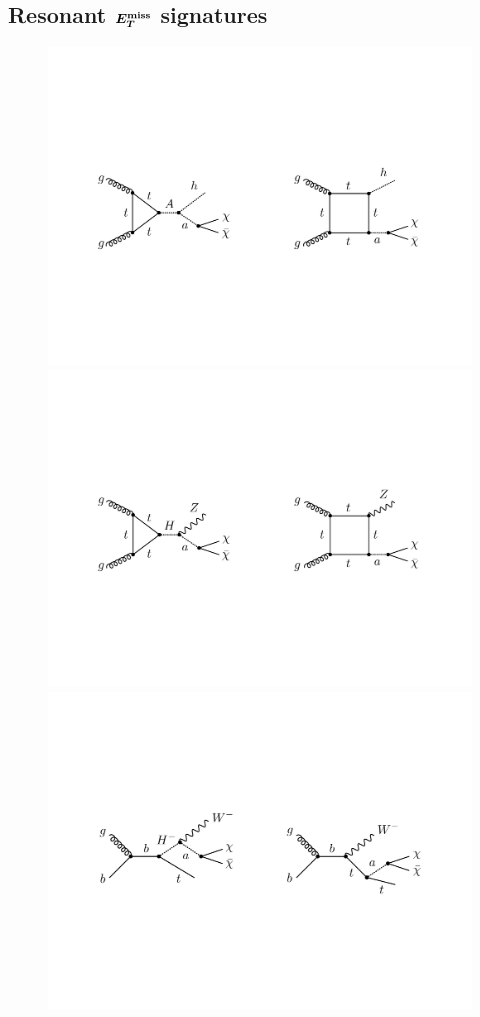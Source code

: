 \documentclass[a4paper, 11pt,notoc]{article}
\def\bm#1{\mbox{\boldmath$#1$\unboldmath}}
\begin{document}
\subsection[Resonant $E_T^{\rm miss}$ signatures]{Resonant $\bm{E_T^{\rm miss}}$ signatures}
\label{sec:resonant}

\begin{figure}[t!]
\centering
\includegraphics[width=.8\textwidth]{hmet.pdf}

\vspace{4mm}

\includegraphics[width=.8\textwidth]{zmet.pdf}

\vspace{5mm}

\includegraphics[width=.8\textwidth]{twmet.pdf}


\end{figure}
\end{document}
